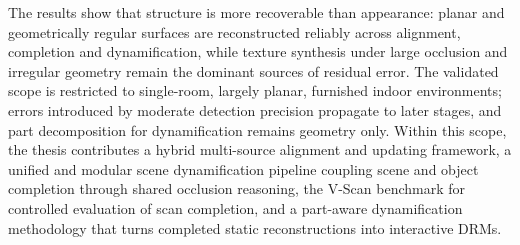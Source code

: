 The results show that structure is more recoverable than appearance: planar and geometrically regular surfaces are reconstructed reliably across alignment, completion and dynamification, while texture synthesis under large occlusion and irregular geometry remain the dominant sources of residual error. The validated scope is restricted to single-room, largely planar, furnished indoor environments; errors introduced by moderate detection precision propagate to later stages, and part decomposition for dynamification remains geometry only. Within this scope, the thesis contributes a hybrid multi-source alignment and updating framework, a unified and modular scene dynamification pipeline coupling scene and object completion through shared occlusion reasoning, the V-Scan benchmark for controlled evaluation of scan completion, and a part-aware dynamification methodology that turns completed static reconstructions into interactive DRMs.


\cleardoublepage


